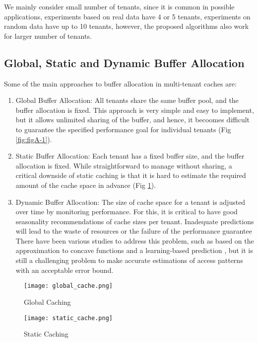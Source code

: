 We mainly consider small number of tenants, since it is common in possible applications, 
experiments based on real data have 4 or 5 tenants, experiments on random data have up 
to 10 tenants, however, the proposed algorithms also work for larger number of tenants.

\subsection{Global, Static and Dynamic Buffer Allocation}

Some of the main approaches to buffer allocation in multi-tenant caches are:

\begin{enumerate}
    \item Global Buffer Allocation: All tenants share the same buffer pool, and the 
    buffer allocation is fixed. This approach is very simple and easy to implement,
    but it allows unlimited sharing of the buffer, and hence, it becoomes difficult to 
    guarantee the specified performance goal for individual tenants
    \cite{article-for-2level-forecasting} (Fig \ref{fig:figA-1}).
    \item Static Buffer Allocation: Each tenant has a fixed buffer size, and the buffer
    allocation is fixed. While straightforward to manage without sharing, a critical 
    downside of static caching is that it is hard to estimate the required amount of 
    the cache space in advance \cite{article-for-2level-forecasting} (Fig \ref{fig:figB-1}).
    \item Dynamic Buffer Allocation: The size of cache space for a tenant is adjusted 
    over time by monitoring performance. For this, it is critical to have good seasonality
    recommendations of cache sizes per tenant. Inadequate predictions will lead to the waste
    of resources or the failure of the performance guarantee \cite{article-for-2level-forecasting}
    There have been various studies to address this problem, such as based on the 
    approximation to concave functions \cite{approx-concave-functions} and a 
    learning-based prediction \cite{learning-based-prediction}, but it is still a 
    challenging problem to make accurate estimations of access patterns with an 
    acceptable error bound.
\end{enumerate}

\begin{figure}[H]
    \centering
    \begin{minipage}{0.4\textwidth}
        \centering
        \texttt{[image: global\_cache.png]}
        \caption{Global Caching}
        \label{fig:figA-1}
    \end{minipage}
    \hfill
    \begin{minipage}{0.4\textwidth}
        \centering
        \texttt{[image: static\_cache.png]}
        \caption{Static Caching}
        \label{fig:figB-1}
    \end{minipage}
\end{figure}

